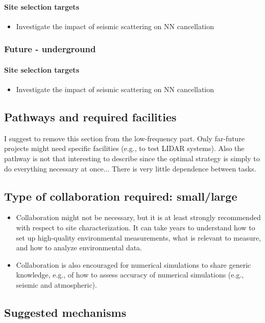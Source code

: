 \paragraph{Site selection targets}
\begin{itemize}
\item Investigate the impact of seismic scattering on NN cancellation
\end{itemize}

\subsubsection{Future - underground}
\paragraph{Site selection targets}
\begin{itemize}
\item Investigate the impact of seismic scattering on NN cancellation
\end{itemize}

\subsection{Pathways and required facilities}
I suggest to remove this section from the low-frequency part. Only far-future projects might need specific facilities (e.g., to test LIDAR systems). Also the pathway is not that interesting to describe since the optimal strategy is simply to do everything necessary at once... There is very little dependence between tasks.

\subsection{Type of collaboration required:  small/large}
\begin{itemize}
\item Collaboration might not be necessary, but it is at least strongly recommended with respect to site characterization. It can take years to understand how to set up high-quality environmental measurements, what is relevant to measure, and how to analyze environmental data.
\item Collaboration is also encouraged for numerical simulations to share generic knowledge, e.g., of how to assess accuracy of numerical simulations (e.g., seismic and atmospheric). 
\end{itemize}

\subsection{Suggested mechanisms}

